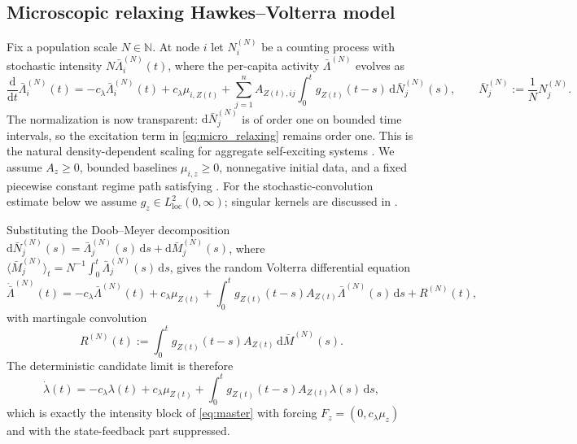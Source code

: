 \documentclass[11pt]{article}
\theoremstyle{plain}
\theoremstyle{definition}
\theoremstyle{remark}
\newcommand{\N}{\mathbb{N}}
\newcommand{\dd}{\mathrm{d}}
\begin{document}
\subsection{Microscopic relaxing Hawkes--Volterra model}

Fix a population scale $N\in\N$. At node $i$ let $N_i^{(N)}$ be a counting process with stochastic
intensity $N\bar\Lambda_i^{(N)}(t)$, where the per-capita activity $\bar\Lambda^{(N)}$ evolves as
\begin{equation}
\label{eq:micro_relaxing}
\frac{\dd}{\dd t}\bar\Lambda_i^{(N)}(t)
= -c_\lambda\bar\Lambda_i^{(N)}(t)+c_\lambda\mu_{i,Z(t)}
  +\sum_{j=1}^n A_{Z(t),ij}\int_0^t g_{Z(t)}(t-s)\,\dd\bar N_j^{(N)}(s),
\qquad \bar N_j^{(N)}:=\frac{1}{N}N_j^{(N)} .
\end{equation}
The normalization is now transparent: $\dd\bar N_j^{(N)}$ is of order one on bounded time
intervals, so the excitation term in \eqref{eq:micro_relaxing} remains order one. This is the
natural density-dependent scaling for aggregate self-exciting systems \cite{ethier1986}. We assume
$A_z\ge0$, bounded baselines $\mu_{i,z}\ge0$, nonnegative initial data, and a fixed piecewise
constant regime path satisfying . For the stochastic-convolution estimate below
we assume $g_z\in L^2_{\mathrm{loc}}(0,\infty)$; singular kernels are discussed in
.

Substituting the Doob--Meyer decomposition
$\dd\bar N_j^{(N)}(s)=\bar\Lambda_j^{(N)}(s)\,\dd s+\dd\bar M_j^{(N)}(s)$, where
$\langle\bar M_j^{(N)}\rangle_t=N^{-1}\int_0^t\bar\Lambda_j^{(N)}(s)\,\dd s$, gives the random
Volterra differential equation
\begin{equation}
\label{eq:micro_decomp_corrected}
\dot{\bar\Lambda}^{(N)}(t)
= -c_\lambda\bar\Lambda^{(N)}(t)+c_\lambda\mu_{Z(t)}
  +\int_0^t g_{Z(t)}(t-s)A_{Z(t)}\bar\Lambda^{(N)}(s)\,\dd s+R^{(N)}(t),
\end{equation}
with martingale convolution
\begin{equation}
\label{eq:martingale_convolution}
R^{(N)}(t):=\int_0^t g_{Z(t)}(t-s)A_{Z(t)}\,\dd\bar M^{(N)}(s).
\end{equation}
The deterministic candidate limit is therefore
\begin{equation}
\label{eq:macro_corrected}
\dot\lambda(t)
= -c_\lambda\lambda(t)+c_\lambda\mu_{Z(t)}
  +\int_0^t g_{Z(t)}(t-s)A_{Z(t)}\lambda(s)\,\dd s,
\end{equation}
which is exactly the intensity block of \eqref{eq:master} with forcing $F_z=(0,c_\lambda\mu_z)$
and with the state-feedback part suppressed.
\end{document}

